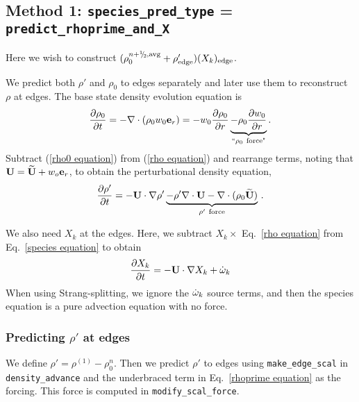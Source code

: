 \subsection{Method 1: {\tt species\_pred\_type} = {\tt predict\_rhoprime\_and\_X}}

Here we wish to construct $(\rho_0^{n+\myhalf,{\rm avg}}        
+ \rho'_\mathrm{edge})(X_k)_\mathrm{edge}$.

We predict both $\rho'$ and $\rho_0$ to edges separately and later use them to 
reconstruct $\rho$ at edges.  The base state density evolution equation is
\begin{equation}
\frac{\partial\rho_0}{\partial t} = -\nabla\cdot(\rho_0 w_0 {\bf e}_r) = 
-w_0\frac{\partial\rho_0}{\partial r} 
\underbrace{-\rho_0\frac{\partial w_0}{\partial r}}_{``\rho_0 ~ \text{force"}}.
\label{rho0 equation}
\end{equation}
Subtract (\ref{rho0 equation}) from (\ref{rho equation}) and rearrange
terms, noting that ${\bf U} = \widetilde{{\bf U}} + w_o{\bf e}_r$, to obtain the
perturbational density equation,
\begin{equation}
\frac{\partial\rho'}{\partial t} = -{\bf U}\cdot\nabla\rho' \underbrace{- \rho'\nabla\cdot{\bf U} 
- \nabla\cdot(\rho_0\widetilde{{\bf U}})}_{\rho' ~ \text{force}} \, .
\label{rhoprime equation}
\end{equation}

We also need $X_k$ at the edges.  Here, we subtract $X_k \times$
Eq.~\ref{rho equation} from Eq.~\ref{species equation} to obtain
\begin{equation}
\frac{\partial X_k}{\partial t} = -{\bf U} \cdot \nabla X_k + \dot{\omega}_k
\end{equation}
When using Strang-splitting, we ignore the $\dot{\omega}_k$ source terms, and
then the species equation is a pure advection equation with no force.

\subsubsection{Predicting $\rho'$ at edges}
We define $\rho' = \rho^{(1)} - \rho_0^n$.  Then we predict $\rho'$ to
edges using {\tt make\_edge\_scal} in {\tt density\_advance} and the
underbraced term in Eq.~\ref{rhoprime equation} as the forcing.  This
force is computed in {\tt modify\_scal\_force}.

